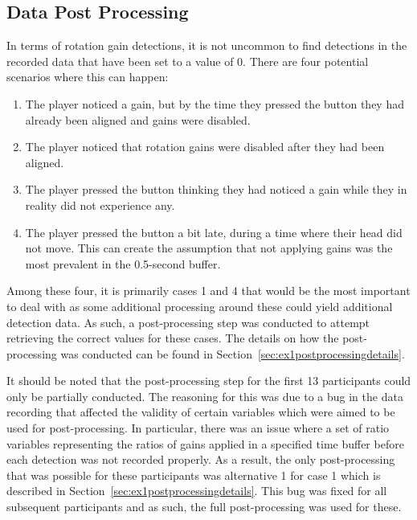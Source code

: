\subsection{Data Post Processing}\label{sec:ex1postprocessing}
In terms of rotation gain detections, it is not uncommon to find detections in the recorded data that have been set to a value of 0. There are four potential scenarios where this can happen:
\begin{enumerate}
    \item The player noticed a gain, but by the time they pressed the button they had already been aligned and gains were disabled.
    \item The player noticed that rotation gains were disabled after they had been aligned. 
    \item The player pressed the button thinking they had noticed a gain while they in reality did not experience any.
    \item The player pressed the button a bit late, during a time where their head did not move. This can create the assumption that not applying gains was the most prevalent in the 0.5-second buffer.  
\end{enumerate}

Among these four, it is primarily cases 1 and 4 that would be the most important to deal with as some additional processing around these could yield additional detection data. As such, a post-processing step was conducted to attempt retrieving the correct values for these cases. The details on how the post-processing was conducted can be found in Section~\ref{sec:ex1postprocessingdetails}. 

It should be noted that the post-processing step for the first 13 participants could only be partially conducted. The reasoning for this was due to a bug in the data recording that affected the validity of certain variables which were aimed to be used for post-processing. In particular, there was an issue where a set of ratio variables representing the ratios of gains applied in a specified time buffer before each detection was not recorded properly. As a result, the only post-processing that was possible for these participants was alternative 1 for case 1 which is described in Section~\ref{sec:ex1postprocessingdetails}. This bug was fixed for all subsequent participants and as such, the full post-processing was used for these. 


   
